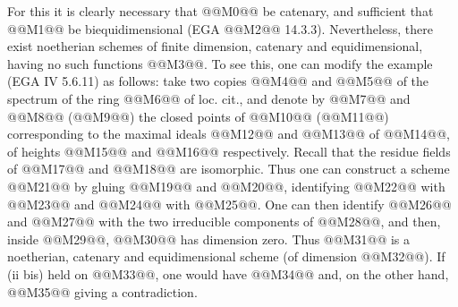 
For this it is clearly necessary that @@M0@@ be catenary, and sufficient that @@M1@@ be biequidimensional (EGA @@M2@@ 14.3.3). Nevertheless, there exist noetherian schemes of finite dimension, catenary and equidimensional, having no such functions @@M3@@. To see this, one can modify the example (EGA IV 5.6.11) as follows: take two copies @@M4@@ and @@M5@@ of the spectrum of the ring @@M6@@ of loc. cit., and denote by @@M7@@ and @@M8@@ (@@M9@@) the closed points of @@M10@@ (@@M11@@) corresponding to the maximal ideals @@M12@@ and @@M13@@ of @@M14@@, of heights @@M15@@ and @@M16@@ respectively. Recall that the residue fields of @@M17@@ and @@M18@@ are isomorphic. Thus one can construct a scheme @@M21@@ by gluing @@M19@@ and @@M20@@, identifying @@M22@@ with @@M23@@ and @@M24@@ with @@M25@@. One can then identify @@M26@@ and @@M27@@ with the two irreducible components of @@M28@@, and then, inside @@M29@@, @@M30@@ has dimension zero. Thus @@M31@@ is a noetherian, catenary and equidimensional scheme (of dimension @@M32@@). If (ii bis) held on @@M33@@, one would have
@@M34@@
and, on the other hand,
@@M35@@
giving a contradiction.

